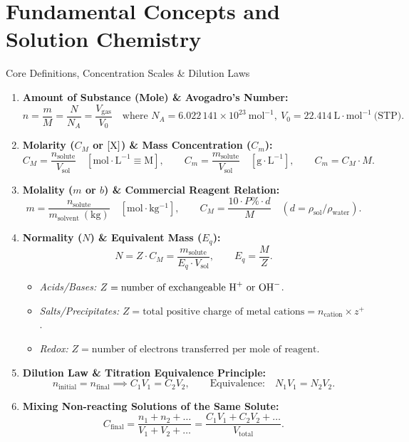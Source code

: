\chapter{Fundamental Concepts and Solution Chemistry}
\label{chap:exo_ch01}

\begin{quicksummary}{Core Definitions, Concentration Scales \& Dilution Laws}
\begin{enumerate}[leftmargin=1.4em,itemsep=3pt]
  \item \textbf{Amount of Substance (Mole) \& Avogadro's Number:}
  \[
  n = \frac{m}{M} = \frac{N}{N_A} = \frac{V_{\text{gas}}}{V_0} \quad \text{where } N_A = 6.022\,141 \times 10^{23}\ \mathrm{mol^{-1}},\ V_0 = 22.414\ \mathrm{L\cdot mol^{-1}}\ \text{(STP)}.
  \]
  \item \textbf{Molarity ($C_M$ or $[\ce{X}]$) \& Mass Concentration ($C_m$):}
  \[
  C_M = \frac{n_{\text{solute}}}{V_{\text{sol}}} \quad [\mathrm{mol\cdot L^{-1}} \equiv \mathrm{M}], \qquad C_m = \frac{m_{\text{solute}}}{V_{\text{sol}}} \quad [\mathrm{g\cdot L^{-1}}], \qquad C_m = C_M \cdot M.
  \]
  \item \textbf{Molality ($m$ or $b$) \& Commercial Reagent Relation:}
  \[
  m = \frac{n_{\text{solute}}}{m_{\text{solvent}}\ (\mathrm{kg})} \quad [\mathrm{mol\cdot kg^{-1}}], \qquad C_M = \frac{10 \cdot P\% \cdot d}{M} \quad (d = \rho_{\text{sol}}/\rho_{\text{water}}).
  \]
  \item \textbf{Normality ($N$) \& Equivalent Mass ($E_q$):}
  \[
  N = Z \cdot C_M = \frac{m_{\text{solute}}}{E_q \cdot V_{\text{sol}}}, \qquad E_q = \frac{M}{Z}.
  \]
  \begin{itemize}[leftmargin=1.2em,itemsep=1pt]
    \item \textit{Acids/Bases:} $Z = \text{number of exchangeable } \ce{H+} \text{ or } \ce{OH-}$.
    \item \textit{Salts/Precipitates:} $Z = \text{total positive charge of metal cations} = n_{\text{cation}} \times z^+$.
    \item \textit{Redox:} $Z = \text{number of electrons transferred per mole of reagent}$.
  \end{itemize}
  \item \textbf{Dilution Law \& Titration Equivalence Principle:}
  \[
  n_{\text{initial}} = n_{\text{final}} \implies C_1 V_1 = C_2 V_2, \qquad \text{Equivalence:} \quad N_1 V_1 = N_2 V_2.
  \]
  \item \textbf{Mixing Non-reacting Solutions of the Same Solute:}
  \[
  C_{\text{final}} = \frac{n_1 + n_2 + \dots}{V_1 + V_2 + \dots} = \frac{C_1 V_1 + C_2 V_2 + \dots}{V_{\text{total}}}.
  \]
\end{enumerate}
\end{quicksummary}

